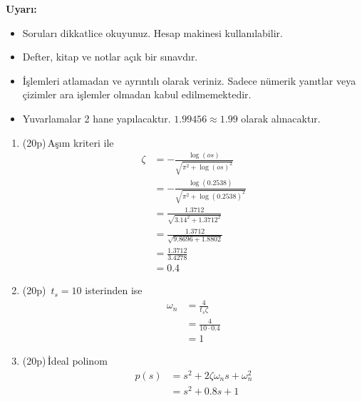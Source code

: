 \noindent\textbf{Uyarı:}
\begin{itemize}\bfseries
	\item Soruları dikkatlice okuyunuz. Hesap makinesi kullanılabilir.
	\item Defter, kitap ve notlar açık bir sınavdır.
	\item İşlemleri atlamadan ve ayrıntılı olarak veriniz. Sadece nümerik yanıtlar veya çizimler ara işlemler olmadan kabul edilmemektedir.
	\item Yuvarlamalar 2 hane yapılacaktır. $\mathbf{1.99456\approx1.99}$ olarak alınacaktır.
\end{itemize}

\begin{enumerate}[\bfseries S1.]
	\item (20p)\,Aşım kriteri ile
	      \begin{equation}
		      \begin{split}
			      \zeta & =-\frac{\log(os)}{\sqrt{\pi^2+\log(os)^2}}       \\
			            & =-\frac{\log(0.2538)}{\sqrt{\pi^2+\log(0.2538)^2}} \\
			            & =\frac{1.3712}{\sqrt{3.14^2+1.3712^2}}             \\
			            & =\frac{1.3712}{\sqrt{9.8696+1.8802}}              \\
			            & =\frac{1.3712}{3.4278}                            \\
			            & =0.4
		      \end{split}
	      \end{equation}
	\item (20p)\,
	      $t_s=10$ isterinden ise
	      \begin{equation}
		      \begin{split}
			      \omega_n & =\frac{4}{t_s\zeta}   \\
			               & =\frac{4}{10\cdot 0.4} \\
			               & =1
		      \end{split}
	      \end{equation}
	\item (20p)\,İdeal polinom
	      \begin{equation}
		      \begin{split}
			      p(s) & =s^2+2\zeta \omega_n s+\omega_n^2 \\
			           & =s^2+0.8s+1
		      \end{split}
	      \end{equation}

\end{enumerate}
